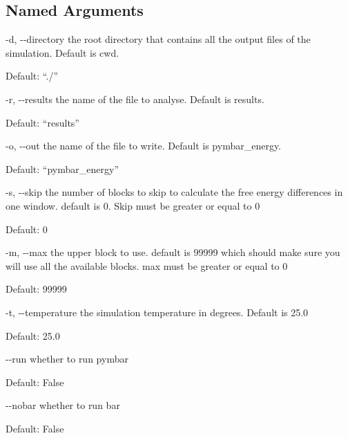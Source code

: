 \documentclass[letterpaper,10pt,english]{sphinxmanual}
\begin{document}
%
\begin{sphinxVerbatim}[commandchars=\\\{\}]
  \PYG{p}{[}\PYG{p}{]} \PYG{p}{[} \PYG{p}{]} \PYG{p}{[} \PYG{p}{]} \PYG{p}{[} \PYG{p}{]} \PYG{p}{[} \PYG{p}{]}
                     \PYG{p}{[} \PYG{p}{]} \PYG{p}{[} \PYG{p}{]} \PYG{p}{[}\PYG{p}{]} \PYG{p}{[}\PYG{p}{]}
\end{sphinxVerbatim}


\subsection{Named Arguments}
\label{\detokenize{tools:Named Arguments}}\begin{optionlist}{3cm}
\item [-d, -{-}directory]  
the root directory that contains all the output files of the simulation. Default is cwd.

Default: “./”
\item [-r, -{-}results]  
the name of the file to analyse. Default is results.

Default: “results”
\item [-o, -{-}out]  
the name of the file to write. Default is pymbar\_energy.

Default: “pymbar\_energy”
\item [-s, -{-}skip]  
the number of blocks to skip to calculate the free energy differences in one window. default is 0. Skip must be greater or equal to 0

Default: 0
\item [-m, -{-}max]  
the upper block to use. default is 99999 which should make sure you will use all the available blocks. max must be greater or equal to 0

Default: 99999
\item [-t, -{-}temperature]  
the simulation temperature in degrees. Default is 25.0

Default: 25.0
\item [-{-}run]  
whether to run pymbar

Default: False
\item [-{-}nobar]  
whether to run bar

Default: False
\end{optionlist}
\end{document}
